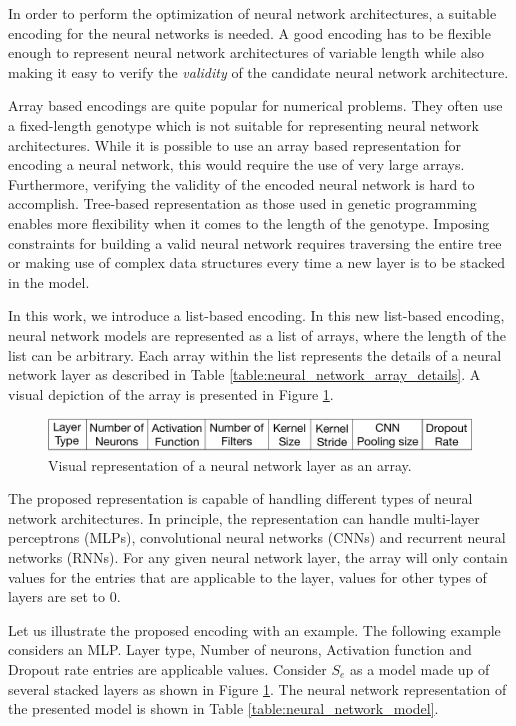 \documentclass[12pt]{elsart}%
\begin{document}
In order to perform the optimization of neural network architectures, a suitable encoding for the neural networks is needed. A good encoding has to be flexible enough to represent neural network architectures of variable length while also making it easy to verify the \textit{validity} of the candidate neural network architecture. 

Array based encodings are quite popular for numerical problems. They often use a fixed-length genotype which is not suitable for representing neural network architectures. While it is possible to use an array based representation for encoding a neural network, this would require the use of very large arrays. Furthermore, verifying the validity of the encoded neural network is hard to accomplish. Tree-based representation as those used in genetic programming \cite{Engelbrecht2007} enables more flexibility when it comes to the length of the genotype. Imposing constraints for building a valid neural network requires traversing the entire tree or making use of complex data structures every time a new layer is to be stacked in the model. 

In this work, we introduce a list-based encoding. In this new list-based encoding, neural network models are represented as a list of arrays, where the length of the list can be arbitrary. Each array within the list represents the details of a neural network layer as described in Table \ref{table:neural_network_array_details}. A visual depiction of the array is presented in Figure \ref{fig:neural_network_array}.
\begin{figure}[!htb]
\centering
\includegraphics[scale=0.3]{Figures/layer_representation.pdf}
\caption{Visual representation of a neural network layer as an array.}
\label{fig:neural_network_array}
\end{figure}

The proposed representation is capable of handling different types of neural network architectures. In principle, the representation can handle multi-layer perceptrons (MLPs), convolutional neural networks (CNNs) and recurrent neural networks (RNNs). For any given neural network layer, the array will only contain values for the entries that are applicable to the layer, values for other types of layers are set to 0.

Let us illustrate the proposed encoding with an example. The following example considers an MLP. Layer type, Number of neurons, Activation function and Dropout rate entries are applicable values. Consider $S_e$ as a model made up of several stacked layers as shown in Figure \ref{fig:neural_network_array}.
The neural network representation of the presented model is shown in Table \ref{table:neural_network_model}.
\end{document}
